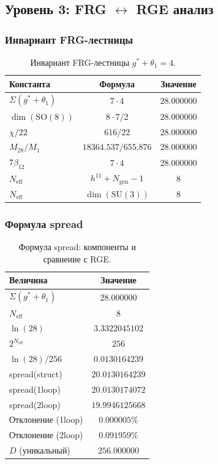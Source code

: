 \documentclass[11pt,a4paper]{article}
\newcommand{\SU}{\ensuremath{\mathrm{SU}}}
\newcommand{\SO}{\ensuremath{\mathrm{SO}}}
\theoremstyle{definition}
\begin{document}
\subsection{Уровень 3: FRG \texorpdfstring{$\leftrightarrow$}{} RGE анализ}
\label{app:level-3-frg}

\subsubsection{Инвариант FRG-лестницы}

\begin{table}[ht]
\centering
\caption{Инвариант FRG-лестницы \texorpdfstring{$g^* + \theta_1 = 4$}{g^* + \_1 = 4}.}
\label{tab:app-invariant}
\begin{tabular}{lcc}
\toprule
Константа & Формула & Значение \\
\midrule
$\Sigma(g^*+\theta_1)$ & $7 \cdot 4$ & $28.000000$ \\
$\dim(\SO(8))$ & $8 \cdot 7/2$ & $28.000000$ \\
$\chi/22$ & $616/22$ & $28.000000$ \\
$M_{28}/M_1$ & $18364.537/655.876$ & $28.000000$ \\
$7\beta_{12}$ & $7 \cdot 4$ & $28.000000$ \\
\midrule
$N_{\text{eff}}$ & $h^{11} + N_{\text{gen}} - 1$ & $8$ \\
$N_{\text{eff}}$ & $\dim(\SU(3))$ & $8$ \\
\bottomrule
\end{tabular}
\end{table}

\subsubsection{Формула spread}

\begin{table}[ht]
\centering
\caption{Формула spread: компоненты и сравнение с RGE.}
\label{tab:app-spread}
\begin{tabular}{lc}
\toprule
Величина & Значение \\
\midrule
$\Sigma(g^*+\theta_1)$ & $28.000000$ \\
$N_{\text{eff}}$ & $8$ \\
$\ln(28)$ & $3.3322045102$ \\
$2^{N_{\text{eff}}}$ & $256$ \\
$\ln(28)/256$ & $0.0130164239$ \\
\midrule
spread(struct) & $20.0130164239$ \\
spread(1loop) & $20.0130174072$ \\
spread(2loop) & $19.9946125668$ \\
\midrule
Отклонение (1loop) & $0.000005\%$ \\
Отклонение (2loop) & $0.091959\%$ \\
$D$ (уникальный) & $256.000000$ \\
\bottomrule
\end{tabular}
\end{table}
\end{document}
